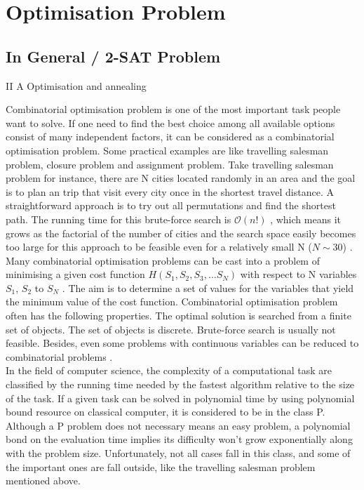 \documentclass[twoside,a4paper,article]{combine}
\begin{document}
\section{Optimisation Problem}
\subsection{In General / 2-SAT Problem}


\cite{Das2008} II A Optimisation and annealing

Combinatorial optimisation problem is one of the most important task people want to solve. If one need to find the best choice among all available options consist of many independent factors, it can be considered as a combinatorial optimisation problem. Some practical examples are like travelling salesman problem, closure problem and assignment problem. Take travelling salesman problem for instance, there are N cities located randomly in an area and the goal is to plan an trip that visit every city once in the shortest travel distance. A straightforward approach is to try out all permutations and find the shortest path. The running time for this brute-force search is $\mathcal{O}(n!)$ , which means it grows as the factorial of the number of cities and the search space easily becomes too large for this approach to be feasible even for a relatively small N ($N \sim 30$) \cite{Santoro2006}. \\

Many combinatorial optimisation problems can be cast into a problem of minimising a given cost function $H(S_1,S_2,S_3,...S_N)$ with respect to N variables $S_1$, $S_2$ to $S_N$ \cite{Das2008}. The aim is to determine a set of values for the variables that yield the minimum value of the cost function. Combinatorial optimisation problem often has the following properties. The optimal solution is searched from a finite set of objects. The set of objects is discrete. Brute-force search is usually not feasible. Besides, even some problems with continuous variables can be reduced to combinatorial problems \cite{Papadimitriou1984}. \\

In the field of computer science, the complexity of a computational task are classified by the running time needed by the fastest algorithm relative to the size of the task. If a given task can be solved in polynomial time by using polynomial bound resource on classical computer, it is considered to be in the class P. Although a P problem does not necessary means an easy problem, a polynomial bond on the evaluation time implies its difficulty won't grow exponentially along with the problem size. Unfortunately, not all cases fall in this class, and some of the important ones are fall outside, like the travelling salesman problem mentioned above.\\
\end{document}
